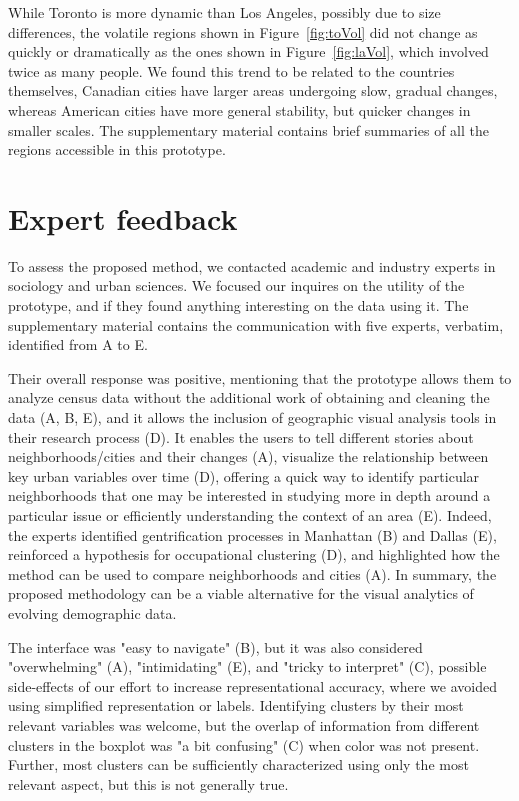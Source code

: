\smallskip While Toronto is more dynamic than Los Angeles, possibly due to size
differences, the volatile regions shown in Figure~\ref{fig:toVol} did not change
as quickly or dramatically as the ones shown in Figure~\ref{fig:laVol}, which
involved twice as many people. We found this trend to be related to the
countries themselves, Canadian cities have larger areas undergoing slow, gradual
changes, whereas American cities have more general stability, but quicker
changes in smaller scales. The supplementary material contains brief summaries
of all the regions accessible in this prototype.




\section{Expert feedback}
To assess the proposed method, we contacted academic and industry experts in
sociology and urban sciences. We focused our inquires on the utility of the
prototype, and if they found anything interesting on the data using it. The
supplementary material contains the communication with five experts, verbatim,
identified from A to E. 


Their overall response was positive,  mentioning that the prototype allows them
to analyze census data without the additional work of obtaining and cleaning the
data (A, B, E), and it allows the inclusion of geographic visual analysis tools
in their research process (D). It enables the users to tell different stories
about neighborhoods/cities and their changes (A), visualize the relationship
between key urban variables over time (D), offering a quick way to identify
particular neighborhoods that one may be interested in studying more in depth
around a particular issue or efficiently understanding the context of an area
(E).  Indeed, the experts identified gentrification processes in Manhattan (B)
and Dallas (E), reinforced a hypothesis for occupational clustering (D), and
highlighted how the method can be used to compare neighborhoods and cities (A).
In summary, the proposed methodology can be a viable alternative for the visual
analytics of evolving demographic data.



The interface was "easy to navigate" (B), but it was also considered
"overwhelming" (A), "intimidating" (E), and "tricky to interpret" (C), possible
side-effects of our effort to increase  representational accuracy, where we
avoided using simplified representation or labels. Identifying clusters by their
most relevant variables was welcome, but the overlap of information from
different clusters in the boxplot was "a bit confusing" (C) when color was not
present. Further, most clusters can be sufficiently characterized using only the
most relevant aspect, but this is not generally true. 


